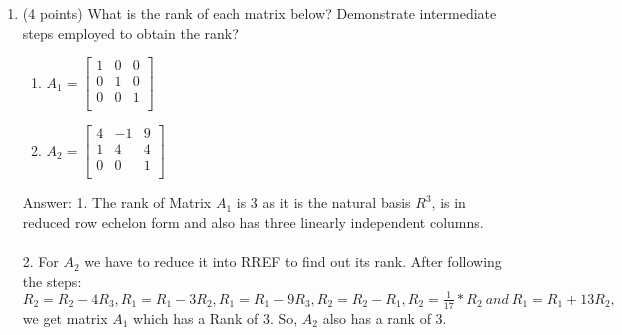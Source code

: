 \documentclass{article}%
\begin{document}
\begin{enumerate}
    \item (4 points) What is the rank of each matrix below? Demonstrate intermediate steps employed to obtain the rank?
    \begin{enumerate}
        \item $A_1 =\begin{bmatrix}
            1 & 0 & 0\\
            0 & 1 & 0\\
            0 & 0 & 1\\
           \end{bmatrix}$
        \item $A_2 =\begin{bmatrix}
            4 & -1 & 9\\
            1 & 4 & 4\\
            0 & 0 & 1\\
           \end{bmatrix}$
    \end{enumerate}


    Answer: 1. The rank of Matrix $A_1$ is 3 as it is the natural basis $R^3$, is in reduced row echelon form and also has three linearly independent columns. \\ \\
    2. For $A_2$ we have to reduce it into RREF to find out its rank. After following the steps: $R_2 = R_2 - 4R_3, R_1 = R_1 - 3R_2, R_1 = R_1 - 9R_3, R_2 = R_2 - R_1, R_2 = \frac{1}{17} * R_2 \ and \ R_1 = R_1 + 13R_2, $ we get matrix $A_1$ which has a Rank of 3. So, $A_2$ also has a rank of 3.
    
\end{enumerate}
\end{document}
